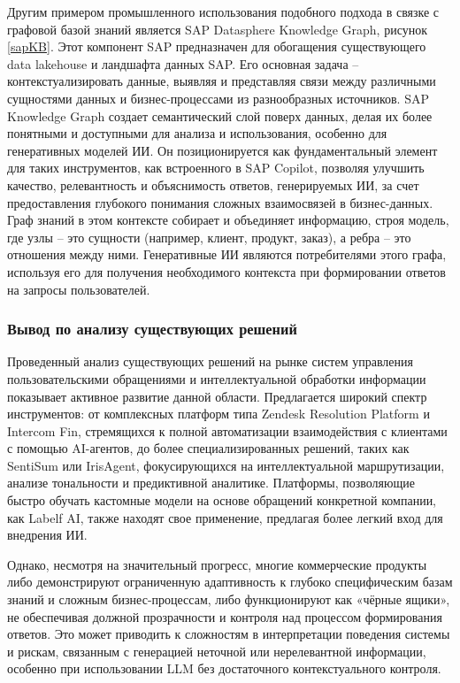
Другим примером промышленного использования подобного подхода в связке с графовой базой знаний является SAP Datasphere Knowledge Graph, рисунок \ref{sapKB}. Этот компонент SAP предназначен для обогащения существующего data lakehouse и  ландшафта данных SAP. Его основная задача – контекстуализировать данные, выявляя и представляя связи между различными сущностями данных и бизнес-процессами из разнообразных источников. SAP Knowledge Graph создает семантический слой поверх данных, делая их более понятными и доступными для анализа и использования, особенно для генеративных моделей ИИ. Он позиционируется как фундаментальный элемент для таких инструментов, как встроенного в SAP Copilot, позволяя улучшить качество, релевантность и объяснимость ответов, генерируемых ИИ, за счет предоставления глубокого понимания сложных взаимосвязей в бизнес-данных. Граф знаний в этом контексте собирает и объединяет информацию, строя модель, где узлы – это сущности (например, клиент, продукт, заказ), а ребра – это отношения между ними. Генеративные ИИ являются потребителями этого графа, используя его для получения необходимого контекста при формировании ответов на запросы пользователей.



\subsubsection{Вывод по анализу существующих решений}

Проведенный анализ существующих решений на рынке систем управления пользовательскими обращениями и интеллектуальной обработки информации показывает активное развитие данной области. Предлагается широкий спектр инструментов: от комплексных платформ типа Zendesk Resolution Platform и Intercom Fin, стремящихся к полной автоматизации взаимодействия с клиентами с помощью AI-агентов, до более специализированных решений, таких как SentiSum или IrisAgent, фокусирующихся на интеллектуальной маршрутизации, анализе тональности и предиктивной аналитике. Платформы, позволяющие быстро обучать кастомные модели на основе обращений конкретной компании, как Labelf AI, также находят свое применение, предлагая более легкий вход для внедрения ИИ.

Однако, несмотря на значительный прогресс, многие коммерческие продукты либо демонстрируют ограниченную адаптивность к глубоко специфическим базам знаний и сложным бизнес-процессам, либо функционируют как «чёрные ящики», не обеспечивая должной прозрачности и контроля над процессом формирования ответов. Это может приводить к сложностям в интерпретации поведения системы и рискам, связанным с генерацией неточной или нерелевантной информации, особенно при использовании LLM без достаточного контекстуального контроля.

